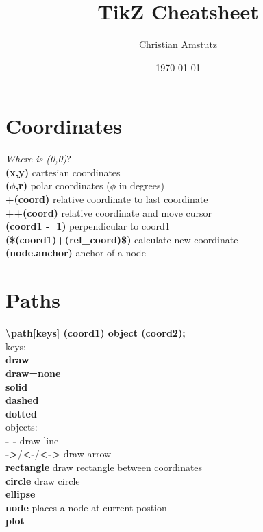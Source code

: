 \documentclass[10pt]{article}
\title{TikZ Cheatsheet}
\author{Christian Amstutz}
\date{\today}
\newcommand{\tikzcmd}[1]{\textbf{#1}}
\begin{document}
    \maketitle

    \begin{multicols}{2}

        \section{Coordinates}
        \emph{Where is (0,0)}?\\
        \tikzcmd{(x,y)} cartesian coordinates\\
        \tikzcmd{($\phi$,r)} polar coordinates ($\phi$ in degrees)\\
        \tikzcmd{+(coord)} relative coordinate to last coordinate\\
        \tikzcmd{++(coord)} relative coordinate and move cursor\\
        \tikzcmd{(coord1 -| 1)} perpendicular to coord1\\
        \tikzcmd{(\$(coord1)+(rel\_coord)\$)} calculate new coordinate \\
        \tikzcmd{(node.anchor)} anchor of a node\\

        \section{Paths}
        \tikzcmd{\textbackslash path[keys] (coord1) object (coord2);}\\
        keys:\\
        \tikzcmd{draw}\\
        \tikzcmd{draw=none}\\
        \tikzcmd{solid}\\
        \tikzcmd{dashed}\\
        \tikzcmd{dotted}\\
        objects:\\
        \tikzcmd{- -} draw line\\
        \tikzcmd{->}/\tikzcmd{<-}/\tikzcmd{<->} draw arrow\\
        \tikzcmd{rectangle} draw rectangle between coordinates\\
        \tikzcmd{circle} draw circle\\
        \tikzcmd{ellipse}\\
        \tikzcmd{node} places a node at current postion\\
        \tikzcmd{plot}\\

    \end{multicols}
\end{document}
